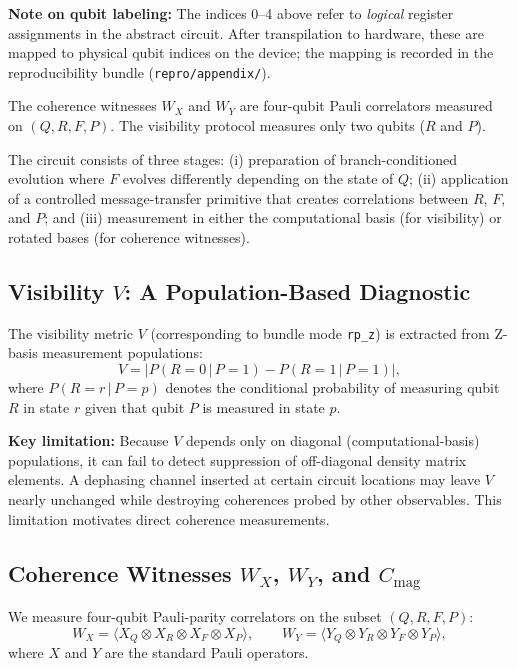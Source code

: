\documentclass[11pt]{article}
\begin{document}
\noindent\textbf{Note on qubit labeling:} The indices 0--4 above refer to \emph{logical} register assignments in the abstract circuit. After transpilation to hardware, these are mapped to physical qubit indices on the device; the mapping is recorded in the reproducibility bundle (\texttt{repro/appendix/}).

The coherence witnesses $W_X$ and $W_Y$ are four-qubit Pauli correlators measured on $(Q, R, F, P)$. The visibility protocol measures only two qubits ($R$ and $P$).

The circuit consists of three stages: (i) preparation of branch-conditioned evolution where $F$ evolves differently depending on the state of $Q$; (ii) application of a controlled message-transfer primitive that creates correlations between $R$, $F$, and $P$; and (iii) measurement in either the computational basis (for visibility) or rotated bases (for coherence witnesses).

\subsection{Visibility \texorpdfstring{$V$}{V}: A Population-Based Diagnostic}
\label{subsec:visibility}

The visibility metric $V$ (corresponding to bundle mode \texttt{rp\_z}) is extracted from Z-basis measurement populations:
\begin{equation}
V = \bigl| P(R=0 \,|\, P=1) - P(R=1 \,|\, P=1) \bigr|,
\end{equation}
where $P(R=r \,|\, P=p)$ denotes the conditional probability of measuring qubit $R$ in state $r$ given that qubit $P$ is measured in state $p$.

\textbf{Key limitation:} Because $V$ depends only on diagonal (computational-basis) populations, it can fail to detect suppression of off-diagonal density matrix elements. A dephasing channel inserted at certain circuit locations may leave $V$ nearly unchanged while destroying coherences probed by other observables. This limitation motivates direct coherence measurements.

\subsection{Coherence Witnesses
  \texorpdfstring{$W_X$}{WX},
  \texorpdfstring{$W_Y$}{WY},
  and \texorpdfstring{$C_\mathrm{mag}$}{Cmag}}
\label{subsec:witnesses}

We measure four-qubit Pauli-parity correlators on the subset $(Q, R, F, P)$:
\begin{equation}
W_X = \langle X_Q \otimes X_R \otimes X_F \otimes X_P \rangle, \qquad
W_Y = \langle Y_Q \otimes Y_R \otimes Y_F \otimes Y_P \rangle,
\end{equation}
where $X$ and $Y$ are the standard Pauli operators.
\end{document}

